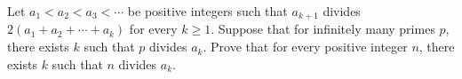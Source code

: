 Let $a_1 < a_2 < a_3 < \cdots$ be positive integers such that $a_{k+1}$ divides $2(a_1 + a_2 + \cdots + a_k)$ for every $k \geq 1$. Suppose that for infinitely many primes $p$, there exists $k$ such that $p$ divides $a_k$. Prove that for every positive integer $n$, there exists $k$ such that $n$ divides $a_k$.
